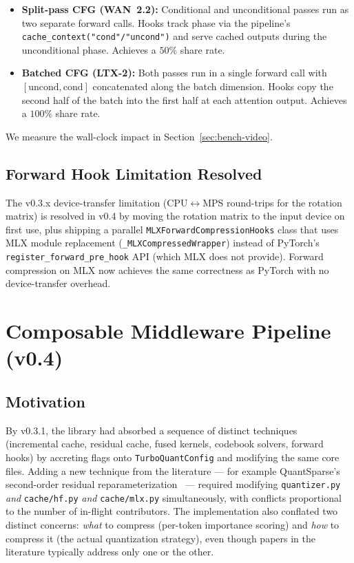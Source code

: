 \documentclass[11pt,a4paper]{article}
\begin{document}
\begin{itemize}
  \item \textbf{Split-pass CFG (WAN~2.2):} Conditional and unconditional passes run as two separate forward calls. Hooks track phase via the pipeline's \texttt{cache\_context("cond"/"uncond")} and serve cached outputs during the unconditional phase. Achieves a $50\%$ share rate.
  \item \textbf{Batched CFG (LTX-2):} Both passes run in a single forward call with $[\text{uncond}, \text{cond}]$ concatenated along the batch dimension. Hooks copy the second half of the batch into the first half at each attention output. Achieves a $100\%$ share rate.
\end{itemize}

We measure the wall-clock impact in Section~\ref{sec:bench-video}.

\subsection{Forward Hook Limitation Resolved}

The v0.3.x device-transfer limitation (CPU$\leftrightarrow$MPS round-trips for the rotation matrix) is resolved in v0.4 by moving the rotation matrix to the input device on first use, plus shipping a parallel \texttt{MLXForwardCompressionHooks} class that uses MLX module replacement (\texttt{\_MLXCompressedWrapper}) instead of PyTorch's \texttt{register\_forward\_pre\_hook} API (which MLX does not provide). Forward compression on MLX now achieves the same correctness as PyTorch with no device-transfer overhead.

\section{Composable Middleware Pipeline (v0.4)}

\subsection{Motivation}

By v0.3.1, the library had absorbed a sequence of distinct techniques (incremental cache, residual cache, fused kernels, codebook solvers, forward hooks) by accreting flags onto \texttt{TurboQuantConfig} and modifying the same core files. Adding a new technique from the literature --- for example QuantSparse's second-order residual reparameterization~\cite{quantsparse2025} --- required modifying \texttt{quantizer.py} \emph{and} \texttt{cache/hf.py} \emph{and} \texttt{cache/mlx.py} simultaneously, with conflicts proportional to the number of in-flight contributors. The implementation also conflated two distinct concerns: \emph{what} to compress (per-token importance scoring) and \emph{how} to compress it (the actual quantization strategy), even though papers in the literature typically address only one or the other.
\end{document}
